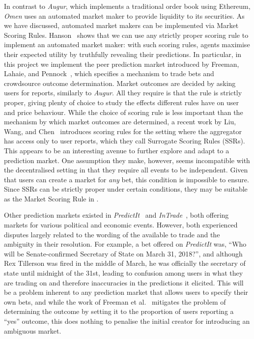 In contrast to \emph{Augur}, which implements a traditional order book using
Ethereum, \emph{Omen} uses an automated market maker to provide liquidity to
its securities. As we have discussed, automated market makers can be
implemented via Market Scoring Rules. Hanson~\cite{Hanson2003} shows that we
can use any strictly proper scoring rule to implement an automated market
maker: with such scoring rules, agents maximise their expected utility by
truthfully revealing their predictions. In particular, in this project we
implement the peer prediction market introduced by Freeman, Lahaie, and
Pennock~\cite{Freeman2017}, which specifies a mechanism to trade bets and
crowdsource outcome determination. Market outcomes are decided by asking users
for reports, similarly to \emph{Augur}. All they require is that the rule is
strictly proper, giving plenty of choice to study the effects different rules
have on user and price behaviour. While the choice of scoring rule is less
important than the mechanism by which market outcomes are determined, a recent
work by Liu, Wang, and Chen~\cite{Liu2020} introduces scoring rules for the
setting where the aggregator has access only to user reports, which they call
Surrogate Scoring Rules (SSRs). This appears to be an interesting avenue to
further explore and adapt to a prediction market. One assumption they make,
however, seems incompatible with the decentralised setting in that they require
all events to be independent.  Given that users can create a market for
\emph{any} bet, this condition is impossible to ensure. Since SSRs can be
strictly proper under certain conditions, they may be suitable as the Market
Scoring Rule in \cite{Freeman2017}. 

Other prediction markets existed in \emph{PredictIt}~\cite{PredictIt} and
\emph{InTrade}~\cite{InTrade}, both offering markets for various political and
economic events. However, both experienced disputes largely related to the
wording of the available to trade and the ambiguity in their resolution. For
example, a bet offered on \emph{PredictIt} was, ``Who will be Senate-confirmed
Secretary of State on March 31, 2018?'', and although Rex Tillerson was fired
in the middle of March, he was officially the secretary of state until midnight
of the 31st, leading to confusion among users in what they are trading on and
therefore inaccuracies in the predictions it elicited. This will be a problem
inherent to any prediction market that allows users to specify their own bets,
and while the work of Freeman et al.~\cite{Freeman2017} mitigates the problem of
determining the outcome by setting it to the proportion of users reporting a
``yes'' outcome, this does nothing to penalise the initial creator for
introducing an ambiguous market.

